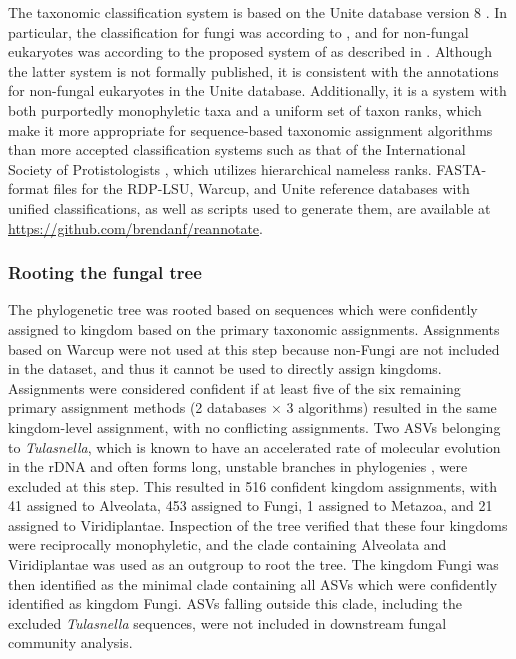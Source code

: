\documentclass[
]{article}
\begin{document}
The taxonomic classification system is based on the Unite database version 8 \autocite{nilsson2019a}.
In particular, the classification for fungi was according to \textcite{tedersoo2018}, and for non-fungal eukaryotes was according to the proposed system of \textcite{tedersoo2017c} as described in \autocite{tedersoodata2017}.
Although the latter system is not formally published, it is consistent with the annotations for non-fungal eukaryotes in the Unite database.
Additionally, it is a system with both purportedly monophyletic taxa and a uniform set of taxon ranks, which make it more appropriate for sequence-based taxonomic assignment algorithms than more accepted classification systems such as that of the International Society of Protistologists \autocite{adl2019}, which utilizes hierarchical nameless ranks.
FASTA-format files for the RDP-LSU, Warcup, and Unite reference databases with unified classifications, as well as scripts used to generate them, are available at \url{https://github.com/brendanf/reannotate}.

\hypertarget{rooting}{%
\subsubsection{Rooting the fungal tree}\label{rooting}}

The phylogenetic tree was rooted based on sequences which were confidently assigned to kingdom based on the primary taxonomic assignments.
Assignments based on Warcup were not used at this step because non-Fungi are not included in the dataset, and thus it cannot be used to directly assign kingdoms.
Assignments were considered confident if at least five of the six remaining primary assignment methods (2 databases × 3 algorithms) resulted in the same kingdom-level assignment, with no conflicting assignments.
Two ASVs belonging to \emph{Tulasnella}, which is known to have an accelerated rate of molecular evolution in the rDNA and often forms long, unstable branches in phylogenies \autocite{moncalvo2006}, were excluded at this step.
This resulted in 516 confident kingdom assignments, with 41 assigned to Alveolata, 453 assigned to Fungi, 1 assigned to Metazoa, and 21 assigned to Viridiplantae.
Inspection of the tree verified that these four kingdoms were reciprocally monophyletic, and the clade containing Alveolata and Viridiplantae was used as an outgroup to root the tree.
The kingdom Fungi was then identified as the minimal clade containing all ASVs which were confidently identified as kingdom Fungi.
ASVs falling outside this clade, including the excluded \emph{Tulasnella} sequences, were not included in downstream fungal community analysis.
\end{document}
